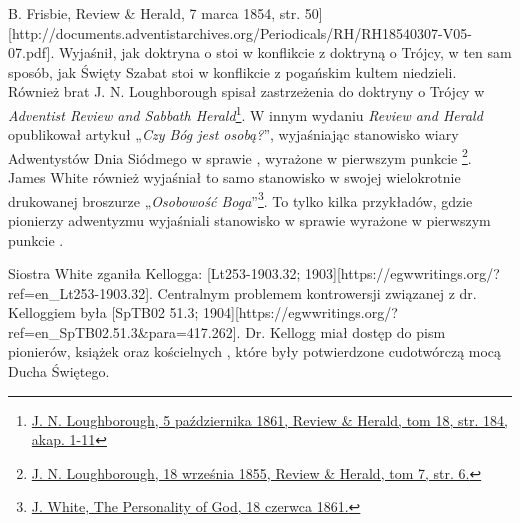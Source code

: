 B. Frisbie, Review \& Herald, 7 marca 1854, str. 50][http://documents.adventistarchives.org/Periodicals/RH/RH18540307-V05-07.pdf]. Wyjaśnił, jak doktryna o  stoi w konflikcie z doktryną o Trójcy, w ten sam sposób, jak Święty Szabat stoi w konflikcie z pogańskim kultem niedzieli. Również brat J. N. Loughborough spisał zastrzeżenia do doktryny o Trójcy w \textit{Adventist Review and Sabbath Herald}\footnote{\href{https://adventistdigitallibrary.org/adl-349160/advent-review-and-sabbath-herald-november-5-1861}{J. N. Loughborough, 5 października 1861, Review \& Herald, tom 18, str. 184, akap. 1-11}}. W innym wydaniu \textit{Review and Herald} opublikował artykuł „\textit{Czy Bóg jest osobą?}”, wyjaśniając stanowisko wiary Adwentystów Dnia Siódmego w sprawie , wyrażone w pierwszym punkcie \footnote{\href{http://documents.adventistarchives.org/Periodicals/RH/RH18550918-V07-06.pdf}{J. N. Loughborough, 18 września 1855, Review \& Herald, tom 7, str. 6.}}. James White również wyjaśniał to samo stanowisko w swojej wielokrotnie drukowanej broszurze „\textit{Osobowość Boga}”\footnote{\href{https://egwwritings.org/?ref=en_PERGO.1.1&para=1471.3}{J. White, The Personality of God, 18 czerwca 1861.}}. To tylko kilka przykładów, gdzie pionierzy adwentyzmu wyjaśniali stanowisko w sprawie  wyrażone w pierwszym punkcie .

Siostra White zganiła Kellogga: [Lt253-1903.32; 1903][https://egwwritings.org/?ref=en\_Lt253-1903.32]. Centralnym problemem kontrowersji związanej z dr. Kelloggiem była [SpTB02 51.3; 1904][https://egwwritings.org/?ref=en\_SpTB02.51.3&para=417.262]. Dr. Kellogg miał dostęp do pism pionierów, książek oraz kościelnych , które były potwierdzone cudotwórczą mocą Ducha Świętego.

